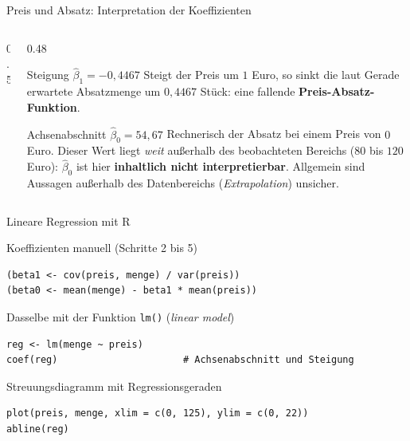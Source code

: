 \documentclass[aspectratio=169,11pt]{beamer}
\def\leuchteliste{80/20,85/17,90/15,95/9,100/11,105/8,110/4,115/4,120/2}
\newcommand{\leuchtepunkte}{\addplot[only marks, mark=*, mark size=2.2pt, color=hsbiblue]
  coordinates {(80,20) (85,17) (90,15) (95,9) (100,11) (105,8) (110,4) (115,4) (120,2)};}
\newcommand{\residuenvon}[4]{%
  \foreach \px/\py in #1 {%
    \pgfmathsetmacro{\yh}{#2 + #3*\px}%
    \edef\tmpdraw{\noexpand\draw[#4] (axis cs:\px,\py) -- (axis cs:\px,\yh);}%
    \tmpdraw
  }}
\begin{document}
\begin{frame}{Preis und Absatz: Interpretation der Koeffizienten}
  \begin{columns}[T]
    \begin{column}{0.5\textwidth}
    \end{column}
    \begin{column}{0.48\textwidth}
      \small
      \begin{block}{Steigung $\hat{\beta}_1 = -0{,}4467$}
        Steigt der Preis um $1$ Euro, so sinkt die laut Gerade erwartete
        Absatzmenge um $0{,}4467$ Stück: eine fallende
        \textbf{Preis-Absatz-Funktion}.
      \end{block}
      \begin{alertblock}{Achsenabschnitt $\hat{\beta}_0 = 54{,}67$}
        Rechnerisch der Absatz bei einem Preis von $0$ Euro. Dieser Wert liegt
        \emph{weit} außerhalb des beobachteten Bereichs ($80$ bis $120$ Euro):
        $\hat{\beta}_0$ ist hier \textbf{inhaltlich nicht interpretierbar}.
        Allgemein sind Aussagen außerhalb des Datenbereichs
        (\emph{Extrapolation}) unsicher.
      \end{alertblock}
    \end{column}
  \end{columns}
\end{frame}

\begin{frame}[fragile]{Lineare Regression mit R}
  \begin{block}{Koeffizienten manuell (Schritte 2 bis 5)}
\begin{lstlisting}
(beta1 <- cov(preis, menge) / var(preis))
(beta0 <- mean(menge) - beta1 * mean(preis))
\end{lstlisting}
  \end{block}

  \begin{block}{Dasselbe mit der Funktion \texttt{lm()} (\emph{linear model})}
\begin{lstlisting}
reg <- lm(menge ~ preis)
coef(reg)                      # Achsenabschnitt und Steigung
\end{lstlisting}
  \end{block}

  \begin{block}{Streuungsdiagramm mit Regressionsgeraden}
\begin{lstlisting}
plot(preis, menge, xlim = c(0, 125), ylim = c(0, 22))
abline(reg)
\end{lstlisting}
  \end{block}
\end{frame}
\end{document}
